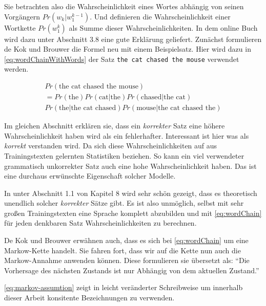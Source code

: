         Sie betrachten also die Wahrscheinlichkeit eines Wortes abhängig von seinen Vorgängern \(Pr(w_k|w_1^{k-1})\). Und definieren die Wahrscheinlichkeit einer Wortkette \(Pr(w_1^k)\) als Summe dieser Wahrscheinlichkeiten. In dem online Buch \parencite{nlwp:book} wird dazu unter Abschnitt 3.8 eine gute Erklärung geliefert. Zunächst formulieren de Kok und Brouwer die Formel neu mit einem Beispielsatz. Hier wird dazu in \autoref{eq:wordChainWithWords} der Satz \texttt{the cat chased the mouse} verwendet werden.
        
        \begin{equation}
        	\begin{split}
        		Pr(\text{the cat chased the mouse}) \\
                = Pr(\text{the}) Pr(\text{cat}|\text{the}) Pr(\text{chased}|\text{the cat}) \\
                Pr(\text{the}|\text{the cat chased}) Pr(\text{mouse}|\text{the cat chased the}) 
            \end{split}
            \label{eq:wordChainWithWords}
        \end{equation}
        
        Im gleichen Abschnitt erklären sie, dass ein \emph{korrekter} Satz eine höhere Wahrscheinlichkeit haben wird als ein fehlerhafter. Interessant ist hier was als \emph{korrekt} verstanden wird. Da sich diese Wahrscheinlichkeiten auf aus Trainingstexten gelernten Statistiken beziehen. So kann ein viel verwendeter grammatisch unkorrekter Satz auch eine hohe Wahrscheinlichkeit haben. Das ist eine durchaus erwünschte Eigenschaft solcher Modelle.
        
        In \parencite{nltk:book} unter Abschnitt 1.1 von Kapitel 8 wird sehr schön gezeigt, dass es theoretisch unendlich solcher \emph{korrekter} Sätze gibt. Es ist also unmöglich, selbst mit sehr großen Trainingstexten eine Sprache komplett abzubilden und mit \autoref{eq:wordChain} für jeden denkbaren Satz Wahrscheinlichkeiten zu berechnen. 
        
        De Kok und Brouwer erwähnen auch, dass es sich bei \autoref{eq:wordChain} um eine Markow-Kette handelt. Sie fahren fort, dass wir auf die Kette nun auch die Markow-Annahme anwenden können. Diese formulieren sie übersetzt als: \enquote{Die Vorhersage des nächsten Zustands ist nur Abhängig von dem aktuellen Zustand.}\parencite[Abs.  3.8]{nlwp:book}
        
        \autoref{eq:markov-assumtion} zeigt \parencite[Abs.  3.8, Gleichung 3.8]{nlwp:book} in leicht veränderter Schreibweise um innerhalb dieser Arbeit konsitente Bezeichnungen zu verwenden.  
        
